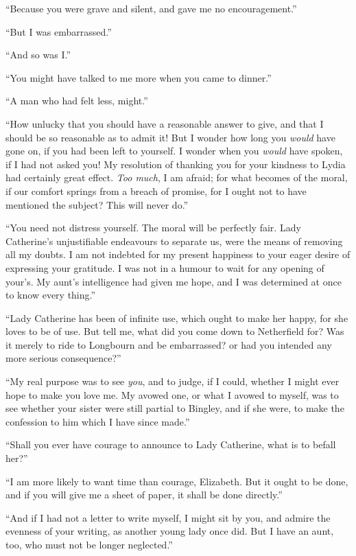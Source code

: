 “Because you were grave and silent, and gave me no
encouragement.”

“But I was embarrassed.”

“And so was I.”

“You might have talked to me more when you came
to dinner.”

“A man who had felt less, might.”

“How unlucky that you should have a reasonable
answer to give, and that I should be so reasonable as to
admit it! But I wonder how long you \textit{would} have gone
on, if you had been left to yourself. I wonder when you
\textit{would} have spoken, if I had not asked you! My resolution
of thanking you for your kindness to Lydia had certainly
great effect. \textit{Too much}, I am afraid; for what becomes
of the moral, if our comfort springs from a breach of
promise, for I ought not to have mentioned the subject?
This will never do.”

“You need not distress yourself. The moral will be
perfectly fair. Lady Catherine’s unjustifiable endeavours
to separate us, were the means of removing all my doubts.
I am not indebted for my present happiness to your
eager desire of expressing your gratitude. I was not in
a humour to wait for any opening of your’s. My aunt’s
intelligence had given me hope, and I was determined at
once to know every thing.”

“Lady Catherine has been of infinite use, which ought
to make her happy, for she loves to be of use. But tell
me, what did you come down to Netherfield for? Was
it merely to ride to Longbourn and be embarrassed? or
had you intended any more serious consequence?”

“My real purpose was to see \textit{you}, and to judge, if I could,
whether I might ever hope to make you love me. My
avowed one, or what I avowed to myself, was to see
whether your sister were still partial to Bingley, and if she
were, to make the confession to him which I have since
made.”

“Shall you ever have courage to announce to Lady
Catherine, what is to befall her?”

“I am more likely to want time than courage, Elizabeth.
But it ought to be done, and if you will give me a sheet
of paper, it shall be done directly.”

“And if I had not a letter to write myself, I might sit
by you, and admire the evenness of your writing, as
another young lady once did. But I have an aunt, too,
who must not be longer neglected.”

